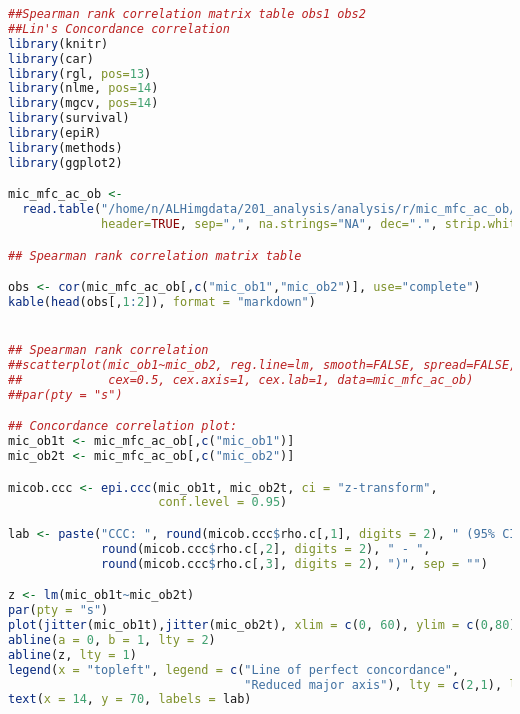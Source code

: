 \begin{lstlisting}[language=R, caption=Image counts by two observsers., label=cd:ob1ob2-concord]
##Spearman rank correlation matrix table obs1 obs2
##Lin's Concordance correlation 
library(knitr)
library(car)
library(rgl, pos=13)
library(nlme, pos=14)
library(mgcv, pos=14)
library(survival)
library(epiR)
library(methods)
library(ggplot2)

mic_mfc_ac_ob <- 
  read.table("/home/n/ALHimgdata/201_analysis/analysis/r/mic_mfc_ac_ob/csv/mic_mfc_ac_ob_4R.csv", 
             header=TRUE, sep=",", na.strings="NA", dec=".", strip.white=TRUE)

## Spearman rank correlation matrix table

obs <- cor(mic_mfc_ac_ob[,c("mic_ob1","mic_ob2")], use="complete")
kable(head(obs[,1:2]), format = "markdown")


## Spearman rank correlation
##scatterplot(mic_ob1~mic_ob2, reg.line=lm, smooth=FALSE, spread=FALSE, boxplots=FALSE, span=0.5, jitter=list(x=1, y=1), 
##            cex=0.5, cex.axis=1, cex.lab=1, data=mic_mfc_ac_ob)
##par(pty = "s")

## Concordance correlation plot:
mic_ob1t <- mic_mfc_ac_ob[,c("mic_ob1")]
mic_ob2t <- mic_mfc_ac_ob[,c("mic_ob2")]

micob.ccc <- epi.ccc(mic_ob1t, mic_ob2t, ci = "z-transform",
                     conf.level = 0.95)

lab <- paste("CCC: ", round(micob.ccc$rho.c[,1], digits = 2), " (95% CI ", 
             round(micob.ccc$rho.c[,2], digits = 2), " - ",
             round(micob.ccc$rho.c[,3], digits = 2), ")", sep = "")

z <- lm(mic_ob1t~mic_ob2t)
par(pty = "s")
plot(jitter(mic_ob1t),jitter(mic_ob2t), xlim = c(0, 60), ylim = c(0,80), cex=1, xlab = "Manual image counts by observer 1", ylab = "Manual image counts by observer 2", pch = 1)
abline(a = 0, b = 1, lty = 2)
abline(z, lty = 1)
legend(x = "topleft", legend = c("Line of perfect concordance", 
                                 "Reduced major axis"), lty = c(2,1), lwd = c(1,1), bty = "n")
text(x = 14, y = 70, labels = lab)
\end{lstlisting}
